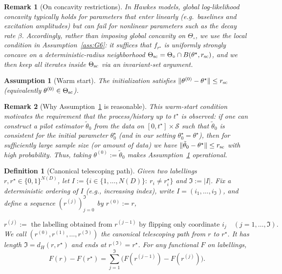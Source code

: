\documentclass{statsoc}
\newtheorem{definition}[definition]{Definition}
\newtheorem{assumption}[assumption]{Assumption}
\newtheorem{remark}[remark]{Remark}
\newcommand{\1}{\mathbbm{1}}
\begin{document}
\begin{remark}[On concavity restrictions]\label{rem:concavity-beta}
In Hawkes models, global log-likelihood concavity typically holds for parameters that enter linearly (e.g.\ baselines and excitation amplitudes) but can fail for nonlinear parameters such as the decay rate $\beta$. Accordingly, rather than imposing global concavity on $\Theta_\circ$, we use the local condition in Assumption~\ref{ass:G6}: it suffices that $f_{r^\star}$ is uniformly strongly concave on a deterministic-radius neighborhood $\Theta_{\rm sc}=\Theta_\circ\cap B(\theta^\star,r_{\rm sc})$, and we then keep all iterates inside $\Theta_{\rm sc}$ via an invariant-set argument.
\end{remark}

\begin{assumption}[Warm start]\label{ass:warmstart}
The initialization satisfies $\|\theta^{(0)}-\theta^\star\|\le r_{\rm sc}$ (equivalently $\theta^{(0)}\in\Theta_{\rm sc}$).
\end{assumption}

\begin{remark}[Why Assumption~\ref{ass:warmstart} is reasonable]\label{rem:warmstart}
This warm-start condition motivates the requirement that the process/history up to \(t^\star\) is observed: if one can construct a pilot estimator \(\tilde\theta_0\) from the data on \([0,t^\star]\times\mathcal S\) such that $\tilde\theta_0$ is consistent for the initial parameter $\theta_0^\star$ (and in our setting $\theta_0^\star=\theta^\star$), then for sufficiently large sample size (or amount of data) we have $\|\tilde\theta_0-\theta^\star\|\le r_{\rm sc}$ with high probability. Thus, taking $\theta^{(0)}:=\tilde\theta_0$ makes Assumption~\ref{ass:warmstart} operational.
\end{remark}

\begin{definition}[Canonical telescoping path]\label{def:telescoping-path}
Given two labellings $r,r^\star\in\{0,1\}^{N(D)}$, let
$I:=\{ i\in\{1,\dots,N(D)\}:\ r_i\neq r_i^\star \}$ and $\mathfrak{I}:=|I|$.
Fix a deterministic ordering of $I$ (e.g., increasing index), write
$I=(i_1,\ldots,i_\mathfrak{I})$, and define a sequence $(r^{(j)})_{j=0}^{\mathfrak I}$ by $r^{(0)}:=r$,

\[r^{(j)}:=\text{ the labelling obtained from } r^{(j-1)} \text{ by flipping only coordinate } i_j
\quad (j=1,\ldots,\mathfrak{I}).
\]
We call $(r^{(0)},r^{(1)},\ldots,r^{(\mathfrak{I})})$ the canonical telescoping path
from $r$ to $r^\star$. It has length $\mathfrak{I}=d_H(r,r^\star)$ and ends at $r^{(\mathfrak{I})}=r^\star$. For any functional $F$ on labellings,
\[
F(r)-F(r^\star)=\sum_{j=1}^\mathfrak{I} \big(F(r^{(j-1)})-F(r^{(j)})\big).
\]
\end{definition}
\end{document}
